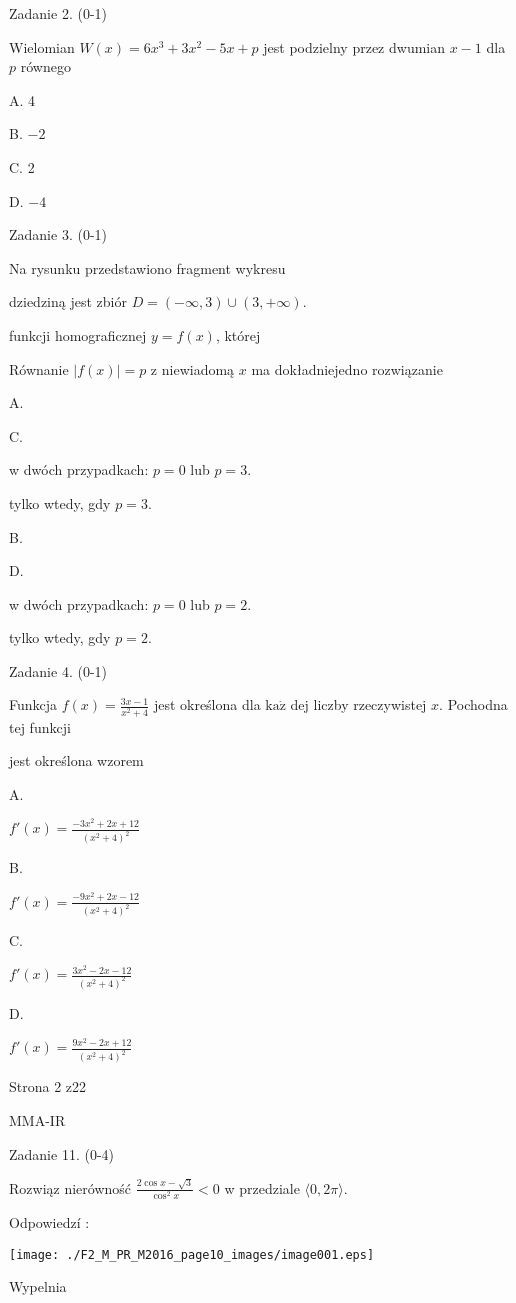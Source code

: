 \documentclass[a4paper,12pt]{article}
\begin{document}
Zadanie 2. (0-1)

Wielomian $W(x)=6x^{3}+3x^{2}-5x+p$ jest podzielny przez dwumian $x-1$ dla $p$ równego

A. 4

B. $-2$

C. 2

D. $-4$

Zadanie 3. (0-1)

Na rysunku przedstawiono fragment wykresu

dziedziną jest zbiór $D=(-\infty,3)\cup(3,+\infty).$

funkcji homograficznej $y=f(x)$, której

Równanie $|f(x)|=p$ z niewiadomą $x$ ma dokładniejedno rozwiązanie

A.

C.

w dwóch przypadkach: $p=0$ lub $p=3.$

tylko wtedy, gdy $p=3.$

B.

D.

w dwóch przypadkach: $p=0$ lub $p=2.$

tylko wtedy, gdy $p=2.$

Zadanie 4. (0-1)

Funkcja $f(x)=\displaystyle \frac{3x-1}{x^{2}+4}$ jest określona dla $\mathrm{k}\mathrm{a}\dot{\mathrm{z}}$ dej liczby rzeczywistej $x$. Pochodna tej funkcji

jest określona wzorem

A.

$f'(x)=\displaystyle \frac{-3x^{2}+2x+12}{(x^{2}+4)^{2}}$

B.

$f'(x)=\displaystyle \frac{-9x^{2}+2x-12}{(x^{2}+4)^{2}}$

C.

$f'(x)=\displaystyle \frac{3x^{2}-2x-12}{(x^{2}+4)^{2}}$

D.

$f'(x)=\displaystyle \frac{9x^{2}-2x+12}{(x^{2}+4)^{2}}$

Strona 2 z22

MMA-IR





Zadanie 11. (0-4)

Rozwiąz nierówność $\displaystyle \frac{2\cos x-\sqrt{3}}{\cos^{2}x}<0$ w przedziale $\langle 0, 2\pi\rangle.$

Odpowiedzí :
\begin{center}
\texttt{[image: ./F2\_M\_PR\_M2016\_page10\_images/image001.eps]}
\end{center}
Wypelnia
\end{document}
